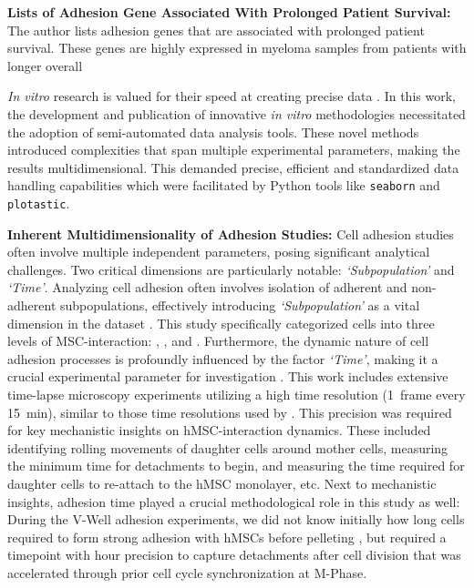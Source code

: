 \textbf{Lists of Adhesion Gene Associated With Prolonged Patient Survival:}
The author lists adhesion genes that are associated with prolonged patient
survival. These genes are highly expressed in myeloma samples from patients with
longer overall








%
\label{sec:discussion_semi_automated_analysis}%
\textit{In vitro} research is valued for their speed at creating precise data
\cite{moleiroCriticalAnalysisAvailable2017}. In this work, the development and
publication of innovative \textit{in vitro} methodologies necessitated the adoption of
semi-automated data analysis tools. These novel methods introduced complexities
that span multiple experimental parameters, making the results multidimensional.
This demanded precise, efficient and standardized data handling capabilities
which were facilitated by Python tools like \texttt{seaborn} and
\texttt{plotastic}.


\textbf{Inherent Multidimensionality of Adhesion Studies:}
Cell adhesion studies often involve multiple independent parameters, posing
significant analytical challenges. Two critical dimensions are particularly
notable: \emph{`Subpopulation'} and \emph{`Time'}. Analyzing cell adhesion often
involves isolation of adherent and non-adherent subpopulations, effectively
introducing \textit{`Subpopulation'} as a vital dimension in the dataset
\cite{dziadowiczBoneMarrowStromaInduced2022}. This study specifically
categorized cells into three levels of MSC-interaction: \CMina, \nMAina, and
\MAina. Furthermore, the dynamic nature of cell adhesion processes is profoundly
influenced by the factor \emph{`Time'}, making it a crucial experimental
parameter for investigation \cite{reblTimedependentMetabolicActivity2010,
    mckayCellcellAdhesionMolecules1997,
    bolado-carrancioPeriodicPropagatingWaves2020a}. This work includes extensive
time-lapse microscopy experiments utilizing a high time resolution
(\SI{1}{frame} every \SI{15}{\minute}), similar to those time resolutions used
by \citet{purschkePhototoxicityHoechst333422010}. This precision was required
for key mechanistic insights on hMSC-\INA interaction dynamics. These included
identifying rolling movements of \nMAina daughter cells around \MAina mother
cells, measuring the minimum time for \INA detachments to begin, and measuring
the time required for daughter cells to re-attach to the hMSC monolayer, etc.
Next to mechanistic insights, adhesion time played a crucial methodological role
in this study as well: During the V-Well adhesion experiments, we did not know
initially how long \INA cells required to form strong adhesion with hMSCs before
pelleting \nMAina, but required a timepoint with hour precision to capture
detachments after cell division that was accelerated through prior cell cycle
synchronization at M-Phase.


